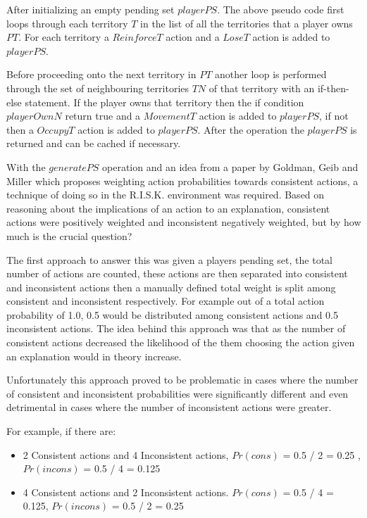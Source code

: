\documentclass[parskip]{cs4rep}
\begin{document}
After initializing an empty pending set $playerPS$. The above pseudo code first loops through each territory $T$ in the list of all the territories that a player owns $PT$. For each territory a $ReinforceT$ action and a $LoseT$ action is added to $playerPS$. 

Before proceeding onto the next territory in $PT$ another loop is performed through the set of neighbouring territories $TN$ of that territory with an if-then-else statement. If the player owns that territory then the if condition $playerOwnN$ return true and a $MovementT$ action is added to $playerPS$, if not then a $OccupyT$ action is added to $playerPS$. After the operation the $playerPS$ is returned and can be cached if necessary.

With the $generatePS$ operation and an idea from a paper by Goldman, Geib and Miller \cite{Goldman99anew} which proposes weighting action probabilities towards consistent actions, a technique of doing so in the R.I.S.K. environment was required. Based on reasoning about the implications of an action to an explanation, consistent actions were positively weighted and inconsistent negatively weighted, but by how much is the crucial question?

The first approach to answer this was given a players pending set, the total number of actions are counted, these actions are then separated into consistent and inconsistent actions then a manually defined total weight is split among consistent and inconsistent respectively. For example out of a total action probability of 1.0, 0.5 would be distributed among consistent actions and 0.5 inconsistent actions. The idea behind this approach was that as the number of consistent actions decreased the likelihood of the them choosing the action given an explanation would in theory increase.

Unfortunately this approach proved to be problematic in cases where the number of consistent and inconsistent probabilities were significantly different and even detrimental in cases where the number of inconsistent actions were greater. 

For example, if there are:

\begin{itemize}
\item
2 Consistent actions and 4 Inconsistent actions, $Pr(cons)$ = 0.5 / 2 = 0.25 , $Pr(incons)$ = 0.5 / 4 = 0.125 
\item
4 Consistent actions and 2 Inconsistent actions. $Pr(cons)$ = 0.5 / 4 = 0.125, $Pr(incons)$ = 0.5 / 2 = 0.25
\end{itemize}
\end{document}
